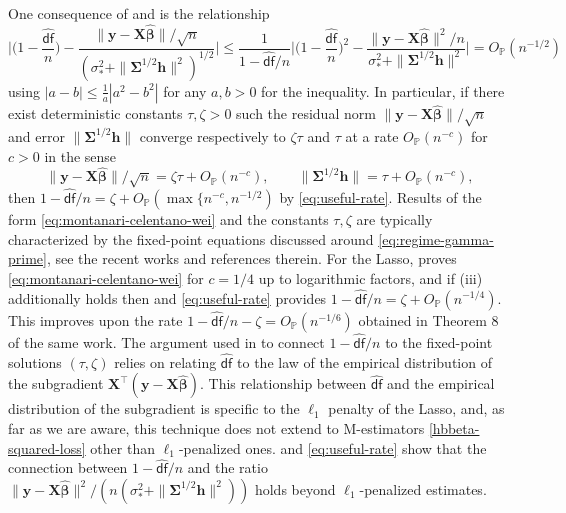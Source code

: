 \documentclass[11pt]{amsart}
\numberwithin{equation}{section}
\numberwithin{equation}{section}
\def\P{{\mathbb{P}}}
\def\mathbold{\boldsymbol} %
\def\bh{\mathbold{h}}\def\hhat{\widehat{h}}\def\htil{\widetilde{h}}
\def\bX{\mathbold{X}}\def\hbX{{\widehat{\bX}}}\def\tbX{{\widetilde{\bX}}}\def\bXbar{{\overline \bX}}
\def\by{\mathbold{y}}\def\yhat{\widehat{y}}\def\ytil{\widetilde{y}}\def\ybar{{\overline y}}\def\vby{{\bf y}}
\def\bbeta{\mathbold{\beta}}\def\betahat{\widehat{\beta}}\def\hbeta{\widehat{\beta}}
\def\hbbeta{{{\widehat{\bbeta}}}}
\def\bSigma{\mathbold{\Sigma}}\def\hbSigma{{\widehat{\bSigma}}}
\def\df{{\hat{\mathsf{df}}}{}}
\newcommand\pb[1]{{ #1 }}
\begin{document}
\pb{
One consequence of 
and \Cref{corollary:square_loss} is the relationship
\begin{equation}
\Big|\bigl(1-\frac{\df}{n}\bigr) - \frac{\|\by-\bX\hbbeta\|/\sqrt n }{(\sigma_*^2 + \|\bSigma^{1/2}\bh\|^2)^{1/2}}\Big|
\le
\frac{1}{1-\df/n}
    \Big|\bigl(1-\frac{\df}{n}\bigr)^2 - \frac{\|\by-\bX\hbbeta\|^2/n}{\sigma_*^2 + \|\bSigma^{1/2}\bh\|^2}\Big| = O_\P(n^{-1/2})
    \label{eq:useful-rate}
\end{equation}
using $|a-b|\le \frac1a |a^2-b^2|$ for any $a,b>0$ for the inequality.
In particular, if there exist deterministic constants $\tau,\zeta>0$ such
the residual norm $\|\by-\bX\hbbeta\|/\sqrt n$ and error
$\|\bSigma^{1/2}\bh\|$ converge respectively to $\zeta\tau$ and $\tau$ at
a rate $O_\P(n^{-c})$ for $c>0$ in the sense
\begin{equation}
\|\by-\bX\hbbeta\|/\sqrt n= \zeta\tau +  O_\P(n^{-c}),
\qquad
\|\bSigma^{1/2}\bh\| = \tau + O_\P(n^{-c}),
\label{eq:montanari-celentano-wei}
\end{equation}
then $1-\df/n = \zeta +O_\P(\max\{n^{-c}, n^{-1/2})$ by \eqref{eq:useful-rate}.
Results of the form \eqref{eq:montanari-celentano-wei} and the
constants $\tau,\zeta$ are typically
characterized by the fixed-point equations discussed around \eqref{eq:regime-gamma-prime}, see the recent works \cite{celentano2020lasso,loureiro2021capturing} and references therein. For the Lasso, \cite[Theorems 5 and 7]{celentano2020lasso} proves \eqref{eq:montanari-celentano-wei} for $c=1/4$ up to logarithmic factors,
and if \Cref{assum:g}(iii) additionally holds then
\Cref{corollary:square_loss} and \eqref{eq:useful-rate} provides
$1-\df/n = \zeta + O_\P(n^{-1/4})$. This improves upon the rate
$1-\df/n-\zeta =  O_\P(n^{-1/6})$ obtained in Theorem 8 of the same work.
The argument used in \citep{miolane2018distribution,celentano2020lasso}
to connect $1-\df/n$ to the
fixed-point solutions $(\tau,\zeta)$ relies on relating $\df$  to
the law of the empirical distribution of the 
subgradient $\bX^\top(\by-\bX\hbbeta)$.
This relationship between $\df$ and the empirical distribution of 
the subgradient is specific to the $\ell_1$ penalty of the Lasso, and, as far as we
are aware, this technique does not extend to M-estimators \eqref{hbbeta-squared-loss}
other than $\ell_1$-penalized ones.
\Cref{corollary:square_loss} and \eqref{eq:useful-rate} show that
the connection between $1-\df/n$ and the ratio
$\|\by-\bX\hbbeta\|^2/(n(\sigma_*^2+\|\bSigma^{1/2}\bh\|^2))$
holds beyond $\ell_1$-penalized estimates.
}
\end{document}
